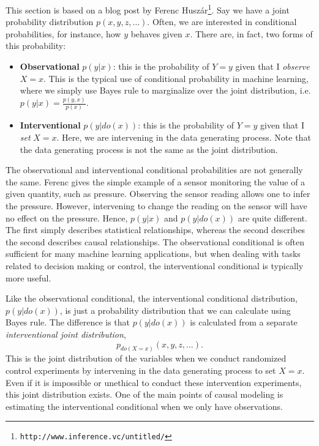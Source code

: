 This section is based on a blog post by Ferenc Husz\'ar\footnote{\texttt{http://www.inference.vc/untitled/}}. Say we have a joint probability distribution $p(x, y, z, \dots)$. Often, we are interested in conditional probabilities, for instance, how $y$ behaves given $x$. There are, in fact, two forms of this probability:
\begin{itemize}
    \item \textbf{Observational} $p(y | x)$: this is the probability of $Y = y$ given that I \textit{observe} $X = x$. This is the typical use of conditional probability in machine learning, where we simply use Bayes rule to marginalize over the joint distribution, i.e. $p(y | x) = \frac{p(y, x)}{p(x)}$.
    \item \textbf{Interventional} $p(y | do(x))$: this is the probability of $Y=y$ given that I \textit{set} $X=x$. Here, we are intervening in the data generating process. Note that the data generating process is not the same as the joint distribution.
\end{itemize}
The observational and interventional conditional probabilities are not generally the same. Ferenc gives the simple example of a sensor monitoring the value of a given quantity, such as pressure. Observing the sensor reading allows one to infer the pressure. However, intervening to change the reading on the sensor will have no effect on the pressure. Hence, $p(y|x)$ and $p(y|do(x))$ are quite different. The first simply describes statistical relationships, whereas the second describes the second describes causal relationships. The observational conditional is often sufficient for many machine learning applications, but when dealing with tasks related to decision making or control, the interventional conditional is typically more useful.

Like the observational conditional, the interventional conditional distribution, $p(y | do(x))$, is just a probability distribution that we can calculate using Bayes rule. The difference is that $p(y | do(x))$ is calculated from a separate \textit{interventional joint distribution}, $$p_{do(X=x)} (x, y, z, \dots).$$
\noindent This is the joint distribution of the variables when we conduct randomized control experiments by intervening in the data generating process to set $X=x$. Even if it is impossible or unethical to conduct these intervention experiments, this joint distribution exists. One of the main points of causal modeling is estimating the interventional conditional when we only have observations.


